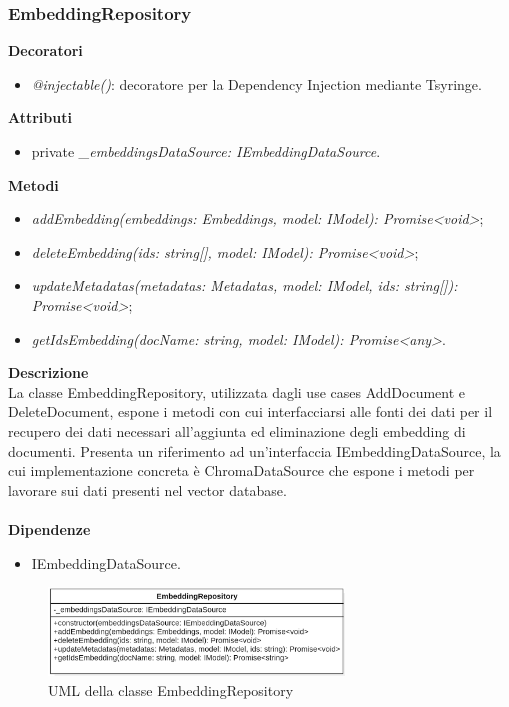 \subsubsection{EmbeddingRepository}
\textbf{Decoratori}
\begin{itemize}
    \item \textit{@injectable()}: decoratore per la Dependency Injection mediante Tsyringe.
\end{itemize}
\textbf{Attributi}
\begin{itemize}
    \item private \textit{\_embeddingsDataSource: IEmbeddingDataSource}.
\end{itemize}
\textbf{Metodi}
\begin{itemize}[itemsep=-4pt]
    \item \textit{addEmbedding(embeddings: Embeddings, model: IModel): Promise<void>};
    \item \textit{deleteEmbedding(ids: string[], model: IModel): Promise<void>};
    \item \textit{updateMetadatas(metadatas: Metadatas, model: IModel, ids: string[]): Promise<void>};
    \item \textit{getIdsEmbedding(docName: string, model: IModel): Promise<any>}.
\end{itemize}
\textbf{Descrizione}\\
La classe EmbeddingRepository, utilizzata dagli use cases AddDocument e DeleteDocument, espone i metodi con cui interfacciarsi alle fonti dei dati per il recupero dei dati necessari all'aggiunta ed eliminazione degli embedding di documenti. Presenta un riferimento ad un'interfaccia IEmbeddingDataSource, la cui implementazione concreta è ChromaDataSource che espone i metodi per lavorare sui dati presenti nel vector database.\\ \\
\textbf{Dipendenze}
\begin{itemize}
    \item IEmbeddingDataSource.
\end{itemize}

\begin{figure}[h!]
    \centering  
    \includegraphics[width=0.7\textwidth]{EmbeddingRepository.png}
    \caption{UML della classe EmbeddingRepository}
\end{figure}

